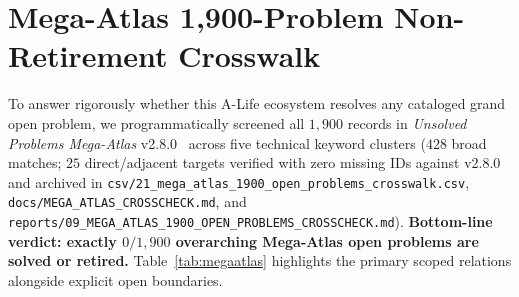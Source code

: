 \documentclass[11pt,reqno]{amsart}
\theoremstyle{plain}
\theoremstyle{definition}
\theoremstyle{remark}
\newcommand{\code}[1]{{\footnotesize\nolinkurl{#1}}}
\begin{document}
\section{Mega-Atlas 1,900-Problem Non-Retirement Crosswalk}
\label{sec:megaatlas}

To answer rigorously whether this A-Life ecosystem resolves any cataloged grand open problem, we programmatically screened all $1{,}900$ records in \emph{Unsolved Problems Mega-Atlas} v2.8.0~\cite{donahue2026megaatlas} across five technical keyword clusters ($428$ broad matches; $25$ direct/adjacent targets verified with zero missing IDs against v2.8.0 and archived in \code{csv/21_mega_atlas_1900_open_problems_crosswalk.csv}, \code{docs/MEGA_ATLAS_CROSSCHECK.md}, and \code{reports/09_MEGA_ATLAS_1900_OPEN_PROBLEMS_CROSSCHECK.md}). \textbf{Bottom-line verdict: exactly $0 / 1{,}900$ overarching Mega-Atlas open problems are solved or retired.} Table~\ref{tab:megaatlas} highlights the primary scoped relations alongside explicit open boundaries.
\end{document}
